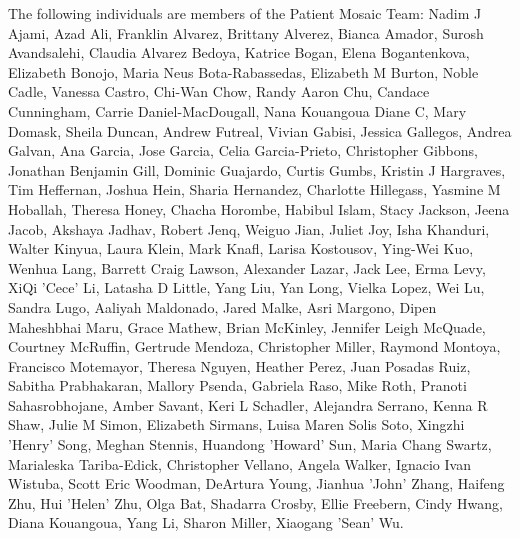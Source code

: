 \documentclass{midl} %
\begin{document}
The following individuals are members of the Patient Mosaic Team: Nadim J Ajami, Azad Ali, Franklin Alvarez, Brittany Alverez, Bianca Amador, Surosh Avandsalehi, Claudia Alvarez Bedoya, Katrice Bogan, Elena Bogantenkova, Elizabeth Bonojo, Maria Neus Bota-Rabassedas, Elizabeth M Burton, Noble Cadle, Vanessa Castro, Chi-Wan Chow, Randy Aaron Chu, Candace Cunningham, Carrie Daniel-MacDougall, Nana Kouangoua Diane C, Mary Domask, Sheila Duncan, Andrew Futreal, Vivian Gabisi, Jessica Gallegos, Andrea Galvan, Ana Garcia, Jose Garcia, Celia Garcia-Prieto, Christopher Gibbons, Jonathan Benjamin Gill, Dominic Guajardo, Curtis Gumbs, Kristin J Hargraves, Tim Heffernan, Joshua Hein, Sharia Hernandez, Charlotte Hillegass, Yasmine M Hoballah, Theresa Honey, Chacha Horombe, Habibul Islam, Stacy Jackson, Jeena Jacob, Akshaya Jadhav, Robert Jenq, Weiguo Jian, Juliet Joy, Isha Khanduri, Walter Kinyua, Laura Klein, Mark Knafl, Larisa Kostousov, Ying-Wei Kuo, Wenhua Lang, Barrett Craig Lawson, Alexander Lazar, Jack Lee, Erma Levy, XiQi 'Cece' Li, Latasha D Little, Yang Liu, Yan Long, Vielka Lopez, Wei Lu, Sandra Lugo, Aaliyah Maldonado, Jared Malke, Asri Margono, Dipen Maheshbhai Maru, Grace Mathew, Brian McKinley, Jennifer Leigh McQuade, Courtney McRuffin, Gertrude Mendoza, Christopher Miller, Raymond Montoya, Francisco Motemayor, Theresa Nguyen, Heather Perez, Juan Posadas Ruiz, Sabitha Prabhakaran, Mallory Psenda, Gabriela Raso, Mike Roth, Pranoti Sahasrobhojane, Amber Savant, Keri L Schadler, Alejandra Serrano, Kenna R Shaw, Julie M Simon, Elizabeth Sirmans, Luisa Maren Solis Soto, Xingzhi 'Henry' Song, Meghan Stennis, Huandong 'Howard' Sun, Maria Chang Swartz, Marialeska Tariba-Edick, Christopher Vellano, Angela Walker, Ignacio Ivan Wistuba, Scott Eric Woodman, DeArtura Young, Jianhua 'John' Zhang, Haifeng Zhu, Hui 'Helen' Zhu, Olga Bat, Shadarra Crosby, Ellie Freebern, Cindy Hwang, Diana Kouangoua, Yang Li, Sharon Miller, Xiaogang 'Sean' Wu.
\end{document}
